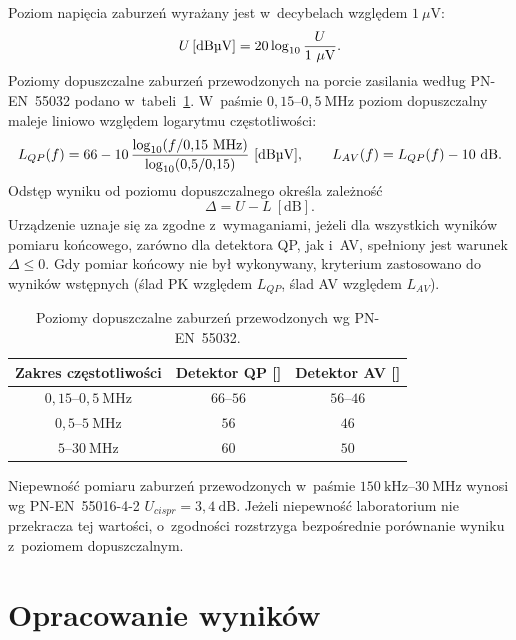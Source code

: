 \documentclass[11pt,a4paper]{article}
\newcommand{\dBuV}{\text{dB\textmu V}}
\begin{document}
Poziom napięcia zaburzeń wyrażany jest w~decybelach względem $1\ \mu\mathrm{V}$:
\begin{equation}
  U\,[\dBuV] = 20\log_{10}\frac{U}{1\ \mu\mathrm{V}}.
  \label{eq:dbuv}
\end{equation}
Poziomy dopuszczalne zaburzeń przewodzonych na porcie zasilania według PN-EN~55032 podano
w~tabeli~\ref{tab:limity}. W~paśmie $0{,}15$--$0{,}5\ \mathrm{MHz}$ poziom dopuszczalny maleje
liniowo względem logarytmu częstotliwości:
\begin{equation}
  L_{QP}(f) = 66 - 10\,\frac{\log_{10}(f/0{,}15\ \mathrm{MHz})}{\log_{10}(0{,}5/0{,}15)}\ [\dBuV],
  \qquad L_{AV}(f) = L_{QP}(f) - 10\ \mathrm{dB}.
  \label{eq:limit}
\end{equation}
Odstęp wyniku od poziomu dopuszczalnego określa zależność
\begin{equation}
  \Delta = U - L\ [\mathrm{dB}].
  \label{eq:delta}
\end{equation}
Urządzenie uznaje się za zgodne z~wymaganiami, jeżeli dla wszystkich wyników pomiaru
końcowego, zarówno dla detektora QP, jak i~AV, spełniony jest warunek $\Delta \le 0$. Gdy pomiar końcowy nie był wykonywany, kryterium
zastosowano do wyników wstępnych (ślad PK względem $L_{QP}$, ślad AV względem $L_{AV}$).

\begin{table}[H]
  \centering
  \small
  \caption{Poziomy dopuszczalne zaburzeń przewodzonych wg PN-EN~55032.}
  \label{tab:limity}
  \renewcommand{\arraystretch}{1.15}
  \begin{tabular}{|c|c|c|}
    \hline
    \textbf{Zakres częstotliwości} & \textbf{Detektor QP [\dBuV]} & \textbf{Detektor AV [\dBuV]} \\
    \hline
    $0{,}15$--$0{,}5\ \mathrm{MHz}$ & $66$--$56$ & $56$--$46$ \\ \hline
    $0{,}5$--$5\ \mathrm{MHz}$      & $56$       & $46$ \\ \hline
    $5$--$30\ \mathrm{MHz}$         & $60$       & $50$ \\ \hline
  \end{tabular}
\end{table}

Niepewność pomiaru zaburzeń przewodzonych w~paśmie $150\ \mathrm{kHz}$--$30\ \mathrm{MHz}$
wynosi wg PN-EN~55016-4-2 $U_{cispr} = 3{,}4\ \mathrm{dB}$. Jeżeli niepewność laboratorium nie
przekracza tej wartości, o~zgodności rozstrzyga bezpośrednie porównanie wyniku z~poziomem
dopuszczalnym.

\section{Opracowanie wyników}
\label{sec:analiza}
\end{document}
